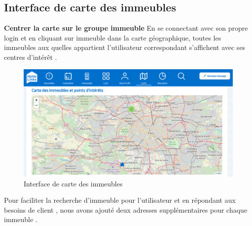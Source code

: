 \documentclass[a4paper,10pt]{book}
\begin{document}
\subsection{Interface de carte des immeubles   }
\par 

 
\textbf{Centrer la carte sur le groupe immeuble  }
En se connectant avec son propre login et en cliquant sur immeuble dans la carte géographique, toutes les immeubles aux quelles appartient l’utilisateur correspondant s’affichent avec ses centres d’intérêt .
\vspace{1cm}
\begin{figure}[!h]
\centering 
\includegraphics[width=1\textwidth]{carte.png}
\caption{Interface de carte des immeubles }
\end{figure}

 Pour faciliter la recherche d’immeuble pour l’utilisateur et en répondant aux besoins de client , nous avons ajouté deux adresses supplémentaires pour chaque immeuble .

\newpage
\end{document}
